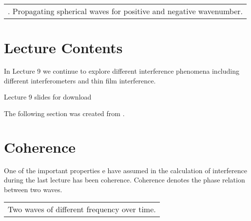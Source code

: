 \documentclass[letterpaper,10pt,english]{sphinxmanual}
\let\sphinxpxdimen\pdfpxdimen\else\newdimen\sphinxpxdimen
\begin{document}
\begin{savenotes}\sphinxattablestart
\centering
\begin{tabulary}{\linewidth}[t]{|T|}
\hline
\sphinxstyletheadfamily 
{} 
\\
\hline
{} . Propagating spherical waves for positive and negative wavenumber.
\\
\hline
\end{tabulary}
\par
\sphinxattableend\end{savenotes}


\section{Lecture Contents}
\label{\detokenize{lectures/L9/overview_9:lecture-contents}}\label{\detokenize{lectures/L9/overview_9::doc}}
In Lecture 9 we continue to explore different interference phenomena including different interferometers and thin film interference.

\noindent\sphinxincludegraphics[width=600\sphinxpxdimen]{{slides12}.png}

Lecture 9 slides for download 

The following section was created from .


\section{Coherence}
\label{\detokenize{notebooks/L9/Interference:Coherence}}\label{\detokenize{notebooks/L9/Interference::doc}}


One of the important properties e have assumed in the calculation of interference during the last lecture has been coherence. Coherence denotes the phase relation between two waves.


\begin{savenotes}\sphinxattablestart
\centering
\begin{tabulary}{\linewidth}[t]{|T|}
\hline
\sphinxstyletheadfamily 
{}
\\
\hline
{} Two waves of different frequency over time.
\\
\hline
\end{tabulary}
\par
\sphinxattableend\end{savenotes}
\end{document}
